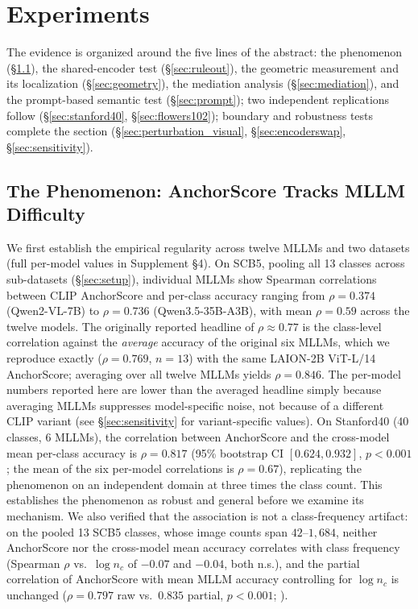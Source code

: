 \documentclass[a4paper,fleqn]{cas-sc}
\begin{document}
\section{Experiments}
\label{sec:experiments}

The evidence is organized around the five lines of the abstract: the phenomenon (\S\ref{sec:phenomenon}), the shared-encoder test (\S\ref{sec:ruleout}), the geometric measurement and its localization (\S\ref{sec:geometry}), the mediation analysis (\S\ref{sec:mediation}), and the prompt-based semantic test (\S\ref{sec:prompt}); two independent replications follow (\S\ref{sec:stanford40}, \S\ref{sec:flowers102}); boundary and robustness tests complete the section (\S\ref{sec:perturbation_visual}, \S\ref{sec:encoderswap}, \S\ref{sec:sensitivity}).

\subsection{The Phenomenon: AnchorScore Tracks MLLM Difficulty}
\label{sec:phenomenon}

We first establish the empirical regularity across twelve MLLMs and two datasets (full per-model values in Supplement \S4). On SCB5, pooling all 13 classes across sub-datasets (\S\ref{sec:setup}), individual MLLMs show Spearman correlations between CLIP AnchorScore and per-class accuracy ranging from $\rho=0.374$ (Qwen2-VL-7B) to $\rho=0.736$ (Qwen3.5-35B-A3B), with mean $\rho=0.59$ across the twelve models. The originally reported headline of $\rho\approx0.77$ \cite{ma2025anchorscore} is the class-level correlation against the \emph{average} accuracy of the original six MLLMs, which we reproduce exactly ($\rho=0.769$, $n=13$) with the same LAION-2B ViT-L/14 AnchorScore; averaging over all twelve MLLMs yields $\rho=0.846$. The per-model numbers reported here are lower than the averaged headline simply because averaging MLLMs suppresses model-specific noise, not because of a different CLIP variant (see \S\ref{sec:sensitivity} for variant-specific values). On Stanford40 (40 classes, 6 MLLMs), the correlation between AnchorScore and the cross-model mean per-class accuracy is $\rho=0.817$ (95\% bootstrap CI $[0.624, 0.932]$, $p<0.001$; the mean of the six per-model correlations is $\rho=0.67$), replicating the phenomenon on an independent domain at three times the class count. This establishes the phenomenon as robust and general before we examine its mechanism. We also verified that the association is not a class-frequency artifact: on the pooled 13 SCB5 classes, whose image counts span $42$--$1{,}684$, neither AnchorScore nor the cross-model mean accuracy correlates with class frequency (Spearman $\rho$ vs.\ $\log n_c$ of $-0.07$ and $-0.04$, both n.s.), and the partial correlation of AnchorScore with mean MLLM accuracy controlling for $\log n_c$ is unchanged ($\rho=0.797$ raw vs.\ $0.835$ partial, $p<0.001$; ).
\end{document}
